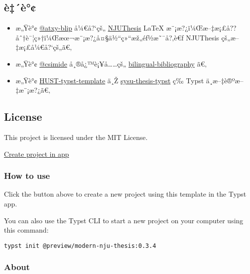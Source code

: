 \subsection{è‡´è°¢}\label{uxe8uxe8}

\begin{itemize}
\tightlist
\item
  æ„Ÿè°¢ \href{https://github.com/atxy-blip}{@atxy-blip} å¼€å?{}`çš„
  \href{https://github.com/nju-lug/NJUThesis}{NJUThesis} LaTeX
  æ¨¡æ?¿ï¼Œæ--‡æ¡£å??åˆ†è¯¦ç»†ï¼Œæœ¬æ¨¡æ?¿å¤§ä½``ç»``æž„éƒ½æ˜¯å?‚è€ƒ
  NJUThesis çš„æ--‡æ¡£å¼€å?{}`çš„ã€‚
\item
  æ„Ÿè°¢ \href{https://github.com/csimide}{@csimide}
  å¸®å¿™è¡¥å\ldots\ldots çš„
  \href{https://github.com/nju-lug/modern-nju-thesis/issues/3}{bilingual-bibliography}
  ã€‚
\item
  æ„Ÿè°¢
  \href{https://github.com/werifu/HUST-typst-template}{HUST-typst-template}
  ä¸Ž
  \href{https://github.com/howardlau1999/sysu-thesis-typst}{sysu-thesis-typst}
  ç­‰ Typst ä¸­æ--‡è®ºæ--‡æ¨¡æ?¿ã€‚
\end{itemize}

\subsection{License}\label{license}

This project is licensed under the MIT License.

\href{/app?template=modern-nju-thesis&version=0.3.4}{Create project in
app}

\subsubsection{How to use}\label{how-to-use}

Click the button above to create a new project using this template in
the Typst app.

You can also use the Typst CLI to start a new project on your computer
using this command:

\begin{verbatim}
typst init @preview/modern-nju-thesis:0.3.4
\end{verbatim}



\subsubsection{About}\label{about}

